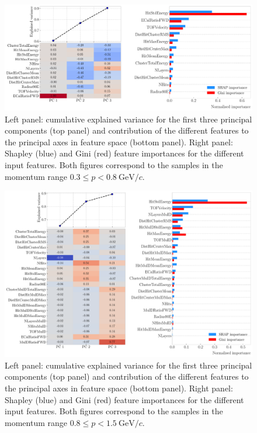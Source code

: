 \begin{figure}[t]
	\centering
	\includegraphics[width=.95\linewidth]{Images/GArSoft_PID/BDT/summary_pca_p0_0.55_sigmap_0.25.pdf}
	\caption{Left panel: cumulative explained variance for the first three principal components (top panel) and contribution of the different features to the principal axes in feature space (bottom panel). Right panel: Shapley (blue) and Gini (red) feature importances for the different input features. Both figures correspond to the samples in the momentum range $0.3 \leq p < 0.8 ~ \mathrm{GeV}/c$.}
	\label{fig:bdt_pca_importance_ii}
\end{figure}

\begin{figure}[t]
	\centering
	\includegraphics[width=.95\linewidth]{Images/GArSoft_PID/BDT/summary_pca_p0_1.15_sigmap_0.35.pdf}
	\caption{Left panel: cumulative explained variance for the first three principal components (top panel) and contribution of the different features to the principal axes in feature space (bottom panel). Right panel: Shapley (blue) and Gini (red) feature importances for the different input features. Both figures correspond to the samples in the momentum range $0.8 \leq p < 1.5 ~ \mathrm{GeV}/c$.}
	\label{fig:bdt_pca_importance_iii}
\end{figure}

